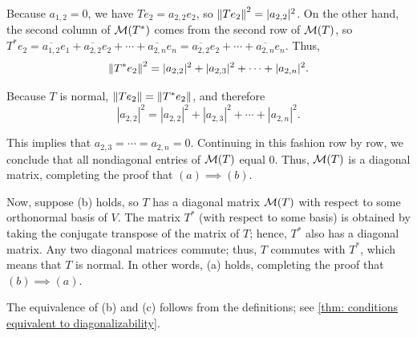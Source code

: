 \begin{prf}
  Because $a_{1,2} = 0$, we have $T e_2 = a_{2,2} e_2$, so $\left \lVert T e_2 \right \rVert^2 = |a_{2,2}|^2$.
  On the other hand, the second column of $\mathcal{M}(T^*)$ comes from the second row of $\mathcal{M}(T)$, so $T^* e_2 = \overline{a_{1,2}} e_1 + \overline{a_{2,2}} e_2 + \cdots + \overline{a_{2,n}} e_n = \overline{a_{2,2}} e_2 + \cdots + \overline{a_{2,n}} e_n$. Thus,
  \[
  \left \lVert T^* e_2 \right \rVert^2 = |a_{2,2}|^2 + |a_{2,3}|^2 + \cdots + |a_{2,n}|^2.
  \]

  Because $T$ is normal, $\left \lVert T e_2 \right \rVert = \left \lVert T^* e_2 \right \rVert$, and therefore
  \begin{equation}
    |a_{2,2}|^2 = |a_{2,2}|^2 + |a_{2,3}|^2 + \cdots + |a_{2,n}|^2.
  \end{equation}

  This implies that $a_{2,3} = \cdots = a_{2,n} = 0$. Continuing in this fashion row by row, we conclude that all nondiagonal entries of $\mathcal{M}(T)$ equal $0$. Thus, $\mathcal{M}(T)$ is a diagonal matrix, completing the proof that $(a) \implies (b)$.

  \StepTwo Now, suppose (b) holds, so $T$ has a diagonal matrix $\mathcal{M}(T)$ with respect to some orthonormal basis of $V$. The matrix $T^*$ (with respect to some basis) is obtained by taking the conjugate transpose of the matrix of $T$; hence, $T^*$ also has a diagonal matrix. Any two diagonal matrices commute; thus, $T$ commutes with $T^*$, which means that $T$ is normal. In other words, (a) holds, completing the proof that $(b) \implies (a)$.

  \StepThree The equivalence of (b) and (c) follows from the definitions; see \ref{thm: conditions equivalent to diagonalizability}.
\end{prf}